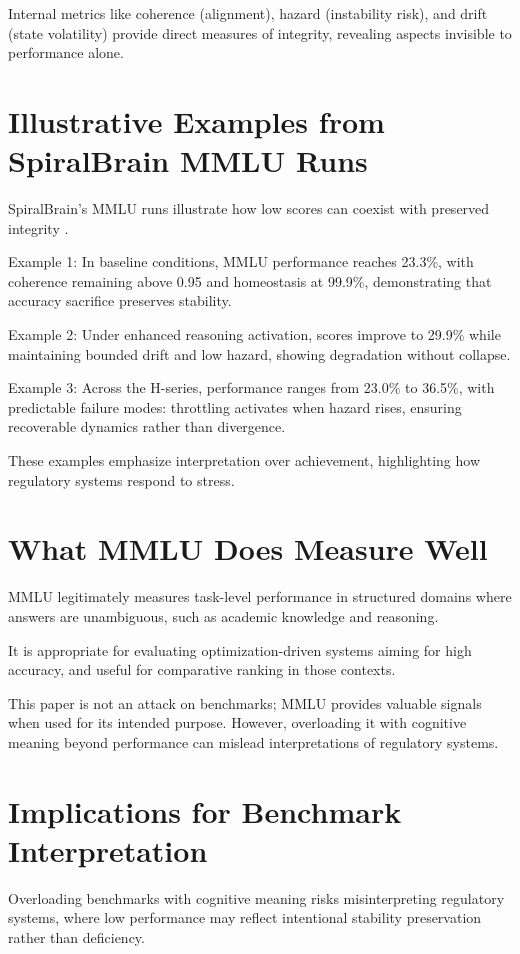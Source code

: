 \documentclass[12pt,a4paper]{report}
\begin{document}
Internal metrics like coherence (alignment), hazard (instability risk), and drift (state volatility) provide direct measures of integrity, revealing aspects invisible to performance alone.

\section{Illustrative Examples from SpiralBrain MMLU Runs}

SpiralBrain's MMLU runs illustrate how low scores can coexist with preserved integrity \cite{Cragin2026Thesis}.

Example 1: In baseline conditions, MMLU performance reaches 23.3\%, with coherence remaining above 0.95 and homeostasis at 99.9\%, demonstrating that accuracy sacrifice preserves stability.

Example 2: Under enhanced reasoning activation, scores improve to 29.9\% while maintaining bounded drift and low hazard, showing degradation without collapse.

Example 3: Across the H-series, performance ranges from 23.0\% to 36.5\%, with predictable failure modes: throttling activates when hazard rises, ensuring recoverable dynamics rather than divergence.

These examples emphasize interpretation over achievement, highlighting how regulatory systems respond to stress.

\section{What MMLU Does Measure Well}

MMLU legitimately measures task-level performance in structured domains where answers are unambiguous, such as academic knowledge and reasoning.

It is appropriate for evaluating optimization-driven systems aiming for high accuracy, and useful for comparative ranking in those contexts.

This paper is not an attack on benchmarks; MMLU provides valuable signals when used for its intended purpose. However, overloading it with cognitive meaning beyond performance can mislead interpretations of regulatory systems.

\section{Implications for Benchmark Interpretation}

Overloading benchmarks with cognitive meaning risks misinterpreting regulatory systems, where low performance may reflect intentional stability preservation rather than deficiency.
\end{document}
